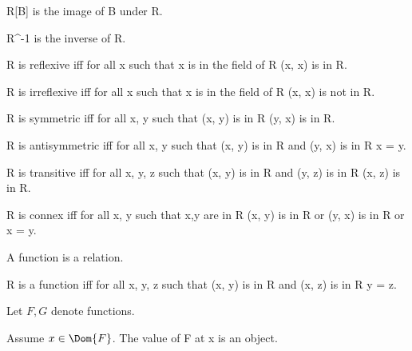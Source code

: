 \documentclass{article}
\begin{document}
\begin{forthel}
    \begin{definition} 
      R[B] is the image of B under R.
    \end{definition}

    \begin{definition} 
      R^{-1} is the inverse of R.
    \end{definition}

    \begin{definition}
      R is reflexive iff for all x such that x is in the field of R (x, x) is in R.
    \end{definition}

    \begin{definition}
      R is irreflexive iff for all x such that x is in the field of R (x, x) is not in R.
    \end{definition}

    \begin{definition}
      R is symmetric iff for all x, y such that (x, y) is in R (y, x) is in R.
    \end{definition}

    \begin{definition}
      R is antisymmetric iff for all x, y such that (x, y) is in R and (y, x) is in R x = y.
    \end{definition}

    \begin{definition}
      R is transitive iff for all x, y, z such that (x, y) is in R and (y, z) is in R (x, z) is in R.
    \end{definition}

    \begin{definition}
      R is connex iff for all x, y such that x,y are in R
        (x, y) is in R or (y, x) is in R or x = y.
    \end{definition}

    \begin{signature}
      A function is a relation.
    \end{signature}

    \begin{axiom}[FunctionIntro]
      R is a function iff for all x, y, z such that (x, y) is in R and (x, z) is in R y = z.
    \end{axiom}

    Let $F, G$ denote functions.

    \begin{signature}
      Assume $x \in \Dom{F}$.
      The value of F at x is an object.
    \end{signature}


\end{forthel}
\end{document}
